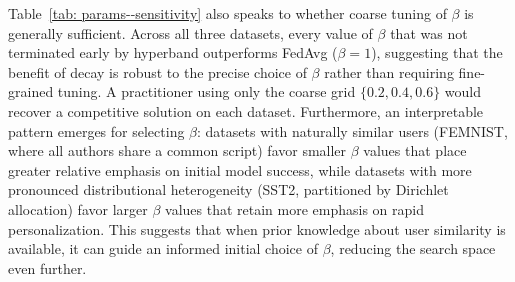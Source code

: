 Table~\ref{tab: params--sensitivity} also speaks to whether coarse tuning of $\beta$ is generally sufficient.
Across all three datasets, every value of $\beta$ that was not terminated early by hyperband outperforms FedAvg ($\beta = 1$), suggesting that the benefit of decay is robust to the precise choice of $\beta$ rather than requiring fine-grained tuning.
A practitioner using only the coarse grid $\{0.2, 0.4, 0.6\}$ would recover a competitive solution on each dataset.
Furthermore, an interpretable pattern emerges for selecting $\beta$: datasets with naturally similar users (FEMNIST, where all authors share a common script) favor smaller $\beta$ values that place greater relative emphasis on initial model success, while datasets with more pronounced distributional heterogeneity (SST2, partitioned by Dirichlet allocation) favor larger $\beta$ values that retain more emphasis on rapid personalization.
This suggests that when prior knowledge about user similarity is available, it can guide an informed initial choice of $\beta$, reducing the search space even further.
